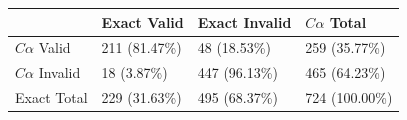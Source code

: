 \begin{tabular}{llll}
\toprule
 & Exact Valid & Exact Invalid & $C\alpha$ Total \\
\midrule
$C\alpha$ Valid & 211 (81.47\%) & 48 (18.53\%) & 259 (35.77\%) \\
$C\alpha$ Invalid & 18 (3.87\%) & 447 (96.13\%) & 465 (64.23\%) \\
Exact Total & 229 (31.63\%) & 495 (68.37\%) & 724 (100.00\%) \\
\bottomrule
\end{tabular}
